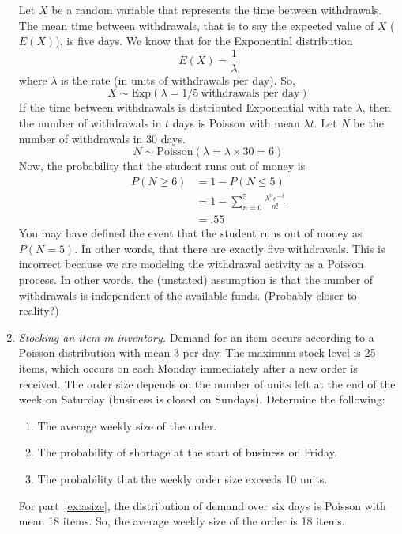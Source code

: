 \begin{enumerate}
\begin{solution}
\bs
Let $X$ be a random variable that represents the time between
withdrawals. The mean time between withdrawals, that is to say the
expected value of $X$ ($E(X)$), is five days. We know that for
the Exponential distribution
\[ E(X) = \frac{1}{\lambda} \]
where $\lambda$ is the rate (in units of withdrawals
per day). So,
\[ X \sim \text{Exp}(\lambda = 1/5~\text{withdrawals per day}) \]
If the time between withdrawals is distributed Exponential with
rate $\lambda$, then the number of withdrawals in $t$ days
is Poisson with mean $\lambda t$. Let $N$ be the number of withdrawals in 30 days.
\[ N \sim \text{Poisson}(\lambda = \lambda \times 30 = 6) \]
Now, the probability that the student runs out of money is
\begin{align*}
      P(N \geq 6) &= 1 - P(N \leq 5) \\
      &= 1 - \sum_{n=0}^{5} \frac{\lambda^n e^{-\lambda}}{n!}\\
      &= .55
\end{align*}
You may have defined the event that the student runs out of money as
$P(N = 5)$. In other words, that there are exactly five withdrawals.
This is incorrect because we are modeling the withdrawal activity as a
Poisson process. In other words, the (unstated) assumption is that the
number of withdrawals is independent of the available funds. (Probably
closer to reality?)
\end{solution}

\item \emph{Stocking an item in inventory.}
Demand for an item occurs according to a Poisson distribution with
mean 3 per day. The maximum stock level is 25 items, which occurs on
each Monday immediately after a new order is received. The order size
depends on the number of units left at the end of the week on Saturday
(business is closed on Sundays). Determine the following:
\begin{enumerate}
\item The average weekly size of the order. \label{ex:asize}
\item The probability of shortage at the start of business on Friday. \label{ex:pshort}
\item The probability that the weekly order size exceeds 10 units. \label{ex:pex}
\end{enumerate}

\begin{solution}
\bs
For part~\ref{ex:asize}, the distribution of demand over six days is
Poisson with mean 18 items. So, the average weekly size
of the order is 18 items.


\end{solution}
\end{enumerate}
